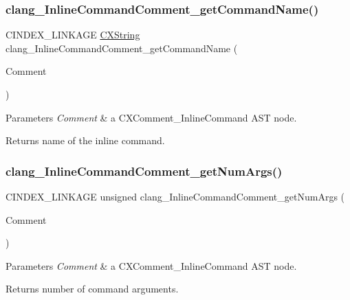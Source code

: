 \subsubsection{\texorpdfstring{clang\+\_\+\+Inline\+Command\+Comment\+\_\+get\+Command\+Name()}{clang\_InlineCommandComment\_getCommandName()}}
{\footnotesize\ttfamily C\+I\+N\+D\+E\+X\+\_\+\+L\+I\+N\+K\+A\+GE \mbox{\hyperlink{structCXString}{C\+X\+String}} clang\+\_\+\+Inline\+Command\+Comment\+\_\+get\+Command\+Name (\begin{DoxyParamCaption}\item[{\mbox{\hyperlink{structCXComment}{C\+X\+Comment}}}]{Comment }\end{DoxyParamCaption})}


\begin{DoxyParams}{Parameters}
{\em Comment} & a {\ttfamily C\+X\+Comment\+\_\+\+Inline\+Command} A\+ST node.\\
\hline
\end{DoxyParams}
\begin{DoxyReturn}{Returns}
name of the inline command. 
\end{DoxyReturn}
\mbox{\label{group__CINDEX__COMMENT_ga78db1049239be9649c2829cdeb83c544}} 
\subsubsection{\texorpdfstring{clang\+\_\+\+Inline\+Command\+Comment\+\_\+get\+Num\+Args()}{clang\_InlineCommandComment\_getNumArgs()}}
{\footnotesize\ttfamily C\+I\+N\+D\+E\+X\+\_\+\+L\+I\+N\+K\+A\+GE unsigned clang\+\_\+\+Inline\+Command\+Comment\+\_\+get\+Num\+Args (\begin{DoxyParamCaption}\item[{\mbox{\hyperlink{structCXComment}{C\+X\+Comment}}}]{Comment }\end{DoxyParamCaption})}


\begin{DoxyParams}{Parameters}
{\em Comment} & a {\ttfamily C\+X\+Comment\+\_\+\+Inline\+Command} A\+ST node.\\
\hline
\end{DoxyParams}
\begin{DoxyReturn}{Returns}
number of command arguments. 
\end{DoxyReturn}
\mbox{\label{group__CINDEX__COMMENT_ga3dd54ce1288d09c408cac8c887da2ebd}} 
